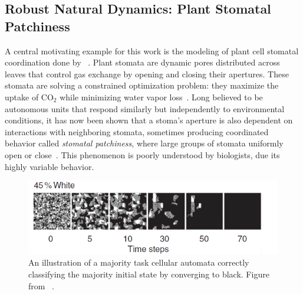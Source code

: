 \documentclass[a4paper,11pt]{article}
\begin{document}
\subsection{Robust Natural Dynamics: Plant Stomatal Patchiness}
\label{subsec:Stoma}
A central motivating example for this work is the modeling of plant cell stomatal coordination done by \citeauthor{pe04}~\cite{pe04}. Plant stomata are dynamic pores distributed across leaves that control gas exchange by opening and closing their apertures. These stomata are solving a constrained optimization problem: they maximize the uptake of CO$_\text{2}$ while minimizing water vapor loss~\cite{mo07,we11}. Long believed to be autonomous units that respond similarly but independently to environmental conditions, it has now been shown that a stoma's aperture is also dependent on interactions with neighboring stomata, sometimes producing coordinated behavior called \textit{stomatal patchiness}, where large groups of stomata uniformly open or close~\cite{pe04}. This phenomenon is poorly understood by biologists, due its highly variable behavior.




\begin{figure}[htp]
	\centering
	\includegraphics[width=1.0\textwidth]{mo07_fig3_maj_task.png}
	\caption[Majority Task CA]{
	An illustration of a majority task cellular automata correctly classifying the majority initial state by converging to black. Figure from \citeauthor{mo07}~\cite{mo07}.
	}
	\label{fig:maj_task}
\end{figure}
\end{document}
